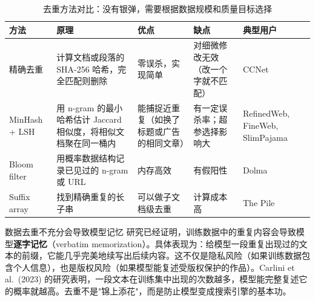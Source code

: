 \begin{table}[H]
\centering
\begin{tabular}{p{}p{}p{}p{}p{}}
\toprule
\textbf{方法} & \textbf{原理} & \textbf{优点} & \textbf{缺点} & \textbf{典型用户} \\
\midrule
精确去重 & 计算文档或段落的 SHA-256 哈希，完全匹配则删除 & 零误杀，实现简单 & 对细微修改无效（改一个字就不匹配） & CCNet \\
MinHash + LSH & 用 n-gram 的最小哈希估计 Jaccard 相似度，将相似文档聚在同一桶内 & 能捕捉近重复（如换了标题或广告的相同文章） & 有一定误杀率；超参选择影响大 & RefinedWeb, FineWeb, SlimPajama \\
Bloom filter & 用概率数据结构记录已见过的 n-gram 或 URL & 内存高效 & 有假阳性 & Dolma \\
Suffix array & 找到精确重复的长子串 & 可以做子文档级去重 & 计算成本高 & The Pile \\
\bottomrule
\end{tabular}
\caption{去重方法对比：没有银弹，需要根据数据规模和质量目标选择}
\end{table}

\begin{warningbox}{数据去重不充分会导致模型记忆}
研究已经证明，训练数据中的重复内容会导致模型\textbf{逐字记忆}（verbatim memorization）。具体表现为：给模型一段重复出现过的文本的前缀，它能几乎完美地续写出后续内容。这不仅是隐私风险（如果训练数据包含个人信息），也是版权风险（如果模型能复述受版权保护的作品）。Carlini et al.~(2023) 的研究表明，一段文本在训练集中出现的次数越多，模型能完整复述它的概率就越高。去重不是"锦上添花"，而是防止模型变成搜索引擎的基本功。
\end{warningbox}

